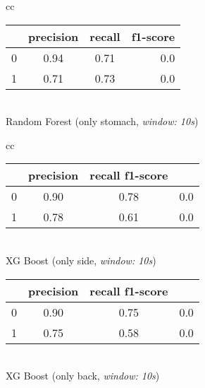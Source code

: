 \begin{table}
\begin{tabular}{cc}
      \begin{minipage}{0.33\textwidth}
          \begin{center}
              \begin{tabular}{ | l | c | c | r | }
                \hline
                 & precision & recall & f1-score \\ \hline
                0 & 0.94 & 0.71 & 0.0 \\ \hline
                1 & 0.71 & 0.73 & 0.0 \\
                \hline
              \end{tabular}
              \smallskip
              \\ Random Forest (only stomach, \textit{window: 10s})
          \end{center}
      \end{minipage}
  \end{tabular}
  \newline
  \vspace*{5mm}
  \newline
  \begin{tabular}{cc}
      \begin{minipage}{0.33\textwidth}
          \begin{center}
              \begin{tabular}{ | l | c | c | r | }
                \hline
                 & precision & recall f1-score \\ \hline
                0 & 0.90 & 0.78 & 0.0 \\ \hline
                1 & 0.78 & 0.61 & 0.0 \\
                \hline
              \end{tabular}
              \smallskip
              \\ XG Boost (only side, \textit{window: 10s})
          \end{center}
      \end{minipage}

      \begin{minipage}{0.33\textwidth}
          \begin{center}
              \begin{tabular}{ | l | c | c | r | }
                \hline
                 & precision & recall f1-score \\ \hline
                0 & 0.90 & 0.75 & 0.0 \\ \hline
                1 & 0.75 & 0.58 & 0.0 \\
                \hline
              \end{tabular}
              \smallskip
              \\ XG Boost (only back, \textit{window: 10s})
          \end{center}
      \end{minipage}
  

\end{tabular}
\end{table}
